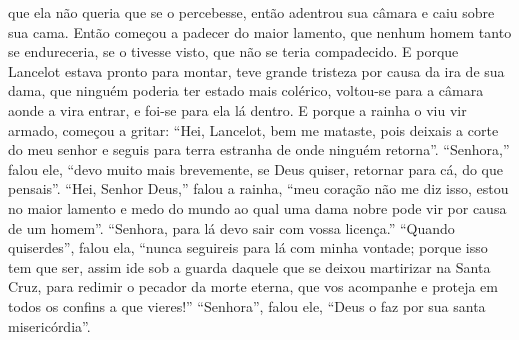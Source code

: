 que ela não queria que se o percebesse, então adentrou sua câmara e caiu sobre
sua cama. Então começou a padecer do maior lamento, que nenhum homem tanto se
endureceria, se o tivesse visto, que não se teria compadecido. E porque
Lancelot estava pronto para montar, teve grande tristeza por causa da ira de
sua dama, que ninguém poderia ter estado mais colérico, voltou-se para a câmara
aonde a vira entrar, e foi-se para ela lá dentro. E porque a rainha o viu vir
armado, começou a gritar: “Hei, Lancelot, bem me mataste, pois deixais a corte
do meu senhor e seguis para terra estranha de onde ninguém retorna”. “Senhora,”
falou ele, “devo muito mais brevemente, se Deus quiser, retornar para cá, do
que pensais”. “Hei, Senhor Deus,” falou a rainha, “meu coração não me diz isso,
estou no maior lamento e medo do mundo ao qual uma dama nobre pode vir por
causa de um homem”. “Senhora, para lá devo sair com vossa licença.” “Quando
quiserdes”, falou ela, “nunca seguireis para lá com minha vontade; porque isso
tem que ser, assim ide sob a guarda daquele que se deixou martirizar na Santa
Cruz, para redimir o pecador da morte eterna, que vos acompanhe e proteja em
todos os confins a que vieres!” “Senhora”, falou ele, “Deus o faz por sua
santa misericórdia”. 

